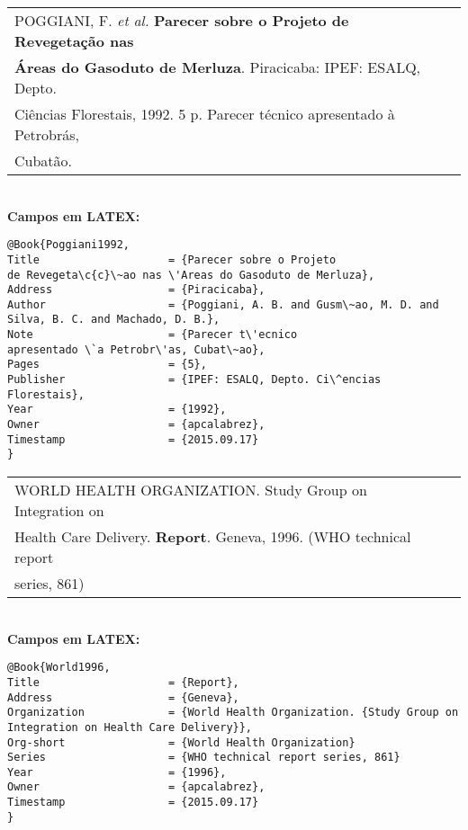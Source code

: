 \begin{tabular}{|l|c|} \hline
	POGGIANI, F. \textit{et al.} \textbf{ Parecer sobre o Projeto de Revegeta\c{c}\~ao nas} \\ \textbf{\'Areas do
		Gasoduto de Merluza}. Piracicaba: IPEF: ESALQ, Depto. \\ Ci\^encias Florestais,
	1992. 5 p. Parecer t\'ecnico apresentado \`a Petrobr\'as,\\Cubat\~ao.   \\\hline
\end{tabular}\\




\textbf{Campos em LATEX:}

\begin{verbatim}
@Book{Poggiani1992,
Title                    = {Parecer sobre o Projeto
de Revegeta\c{c}\~ao nas \'Areas do Gasoduto de Merluza},
Address                  = {Piracicaba},
Author                   = {Poggiani, A. B. and Gusm\~ao, M. D. and 
Silva, B. C. and Machado, D. B.},
Note                     = {Parecer t\'ecnico
apresentado \`a Petrobr\'as, Cubat\~ao},
Pages                    = {5},
Publisher                = {IPEF: ESALQ, Depto. Ci\^encias Florestais},
Year                     = {1992},
Owner                    = {apcalabrez},
Timestamp                = {2015.09.17}
}
\end{verbatim}

\begin{tabular}{|l|c|} \hline
WORLD HEALTH ORGANIZATION.  Study Group on Integration on \\ Health Care Delivery.  \textbf{Report}. Geneva, 1996. (WHO technical report \\ series, 861)  \\\hline
\end{tabular}\\

\textbf{Campos em LATEX:}

\begin{verbatim}
@Book{World1996,
Title                    = {Report},
Address                  = {Geneva},
Organization             = {World Health Organization. {Study Group on 
Integration on Health Care Delivery}},
Org-short                = {World Health Organization}
Series                   = {WHO technical report series, 861}
Year                     = {1996},
Owner                    = {apcalabrez},
Timestamp                = {2015.09.17}
}
\end{verbatim}


